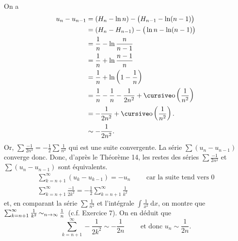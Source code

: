 On a
\begin{align*}
	u_n - u_{n-1} &= (H_n - \ln n) - \big(H_{n-1} - \ln (n-1)\big)\\
	&= (H_n - H_{n-1}) - \big(\ln n - \ln (n-1)\big) \\
	&= \frac{1}{n} - \ln \frac{n}{n-1}\\
	&= \frac{1}{n} + \ln \frac{n-1}{n} \\
	&= \frac{1}{n} + \ln\left( 1 - \frac{1}{n} \right) \\
	&= \frac{1}{n} - \frac{1}{n} - \frac{1}{2n^2} + \po\left( \frac{1}{n^2} \right) \\
	&= -\frac{1}{2n^2} + \po\left( \frac{1}{n^2} \right). \\
	&\sim -\frac{1}{2n^2}.
\end{align*}
Or, $\sum \frac{-1}{2n^2} = -\frac{1}{2}\sum \frac{1}{n^2}$\/ qui est une suite convergente. La série $\sum (u_n - u_{n-1})$\/ converge donc.
Donc, d'après le {\sc Théorème}\/ 14, les restes des séries $\sum \frac{-1}{2n^2}$\/ et $\sum (u_n - u_{n-1})$\/ sont équivalents.
\begin{gather*}
	\sum_{k=n+1}^\infty (u_k - u_{k-1}) = -u_n \qquad \text{ car la suite tend vers 0}\\
	\sum_{k=n+1}^\infty \frac{-1}{2k^2} = -\frac{1}{2} \sum_{k=n+1}^\infty \frac{1}{k^2}
\end{gather*}
et, en comparant la série $\sum \frac{1}{n^2}$\/ et l'intégrale $\int \frac{1}{x^2}~\mathrm{d}x$, on montre que $\sum_{k=n+1}^\infty \frac{1}{k^2} \operatorname*{\sim}_{n\to \infty} \frac{1}{n}$\/~(c.f. {\sc Exercice}\/ 7). On en déduit que \[
	\sum_{k=n+1}^\infty -\frac{1}{2k^2} \sim -\frac{1}{2n} \qquad \text{ et donc } u_n \sim \frac{1}{2n}
.\]








































